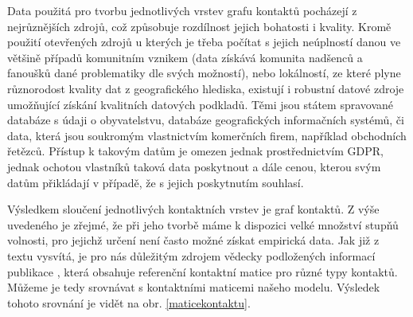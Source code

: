 Data použitá pro tvorbu jednotlivých vrstev grafu kontaktů pocházejí z nejrůznějších zdrojů, což způsobuje rozdílnost jejich bohatosti i kvality. Kromě použití otevřených zdrojů u kterých je třeba počítat s jejich neúplností danou ve většině případů komunitním vznikem (data získává komunita nadšenců a fanoušků dané problematiky dle svých možností), nebo lokálností, ze které plyne různorodost kvality dat z geografického hlediska, existují i robustní datové zdroje umožňující získání kvalitních datových podkladů. Těmi jsou státem spravované databáze s údaji o obyvatelstvu, databáze geografických informačních systémů, či data, která jsou soukromým vlastnictvím komerčních firem, například obchodních řetězců. Přístup k takovým datům je omezen jednak prostřednictvím GDPR, jednak ochotou vlastníků taková data poskytnout a dále cenou, kterou svým datům přikládají v případě, že s jejich poskytnutím souhlasí. 

Výsledkem sloučení jednotlivých kontaktních vrstev je graf kontaktů. Z výše uvedeného je zřejmé, že při jeho tvorbě máme k dispozici velké množství stupňů volnosti, pro jejichž určení není často možné získat empirická data. Jak již z textu vysvítá, je pro nás důležitým zdrojem vědecky podložených informací publikace \cite{Prem_etal2017}, která obsahuje referenční kontaktní matice pro různé typy kontaktů. Můžeme je tedy srovnávat s kontaktními maticemi našeho modelu. Výsledek tohoto srovnání je vidět na obr. \ref{maticekontaktu}.

